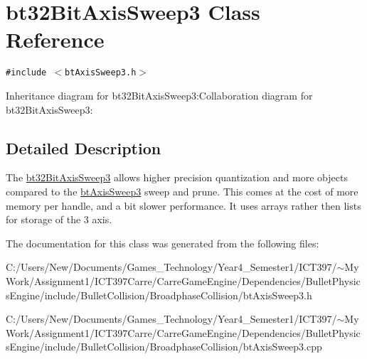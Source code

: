 \hypertarget{classbt32_bit_axis_sweep3}{
\section{bt32BitAxisSweep3 Class Reference}
\label{classbt32_bit_axis_sweep3}
}
{\tt \#include $<$btAxisSweep3.h$>$}

Inheritance diagram for bt32BitAxisSweep3:Collaboration diagram for bt32BitAxisSweep3:

\subsection{Detailed Description}
The \hyperlink{classbt32_bit_axis_sweep3}{bt32BitAxisSweep3} allows higher precision quantization and more objects compared to the \hyperlink{classbt_axis_sweep3}{btAxisSweep3} sweep and prune. This comes at the cost of more memory per handle, and a bit slower performance. It uses arrays rather then lists for storage of the 3 axis. 

The documentation for this class was generated from the following files:\begin{CompactItemize}
\item 
C:/Users/New/Documents/Games\_\-Technology/Year4\_\-Semester1/ICT397/$\sim$My Work/Assignment1/ICT397Carre/CarreGameEngine/Dependencies/BulletPhysicsEngine/include/BulletCollision/BroadphaseCollision/btAxisSweep3.h\item 
C:/Users/New/Documents/Games\_\-Technology/Year4\_\-Semester1/ICT397/$\sim$My Work/Assignment1/ICT397Carre/CarreGameEngine/Dependencies/BulletPhysicsEngine/include/BulletCollision/BroadphaseCollision/btAxisSweep3.cpp\end{CompactItemize}
